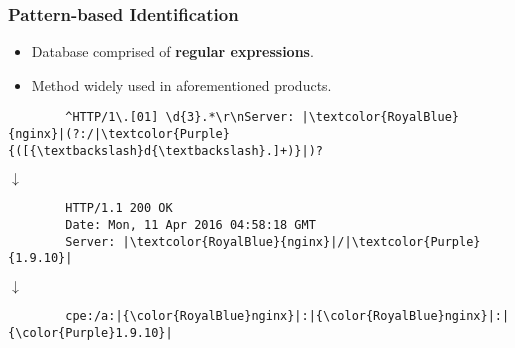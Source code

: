 \documentclass[aspectratio=169,xcolor={usenames,dvipsnames}]{beamer}
\begin{document}
\begin{frame}[fragile]
	\frametitle{Pattern-based Identification}
	
	\begin{itemize}
		\item Database comprised of \textbf{regular expressions}.
		\item Method widely used in aforementioned products.
	\end{itemize}
	
	\vspace{5pt}
	
	\begin{center}
	\begin{minipage}{.8\textwidth}
	\begin{verbatim}
		^HTTP/1\.[01] \d{3}.*\r\nServer: |\textcolor{RoyalBlue}{nginx}|(?:/|\textcolor{Purple}{([{\textbackslash}d{\textbackslash}.]+)}|)?
	\end{verbatim}
	
	\vspace{-7pt}
	\begin{center}
		$\downarrow$
	\end{center}
	\vspace{-7pt}
	
	\begin{verbatim}
		HTTP/1.1 200 OK
		Date: Mon, 11 Apr 2016 04:58:18 GMT
		Server: |\textcolor{RoyalBlue}{nginx}|/|\textcolor{Purple}{1.9.10}|
	\end{verbatim}
	
	\vspace{-7pt}
	\begin{center}
		$\downarrow$
	\end{center}
	\vspace{-7pt}
	
	\begin{verbatim}
		cpe:/a:|{\color{RoyalBlue}nginx}|:|{\color{RoyalBlue}nginx}|:|{\color{Purple}1.9.10}|
	\end{verbatim}
	\end{minipage}
	\end{center}
\end{frame}
\end{document}
